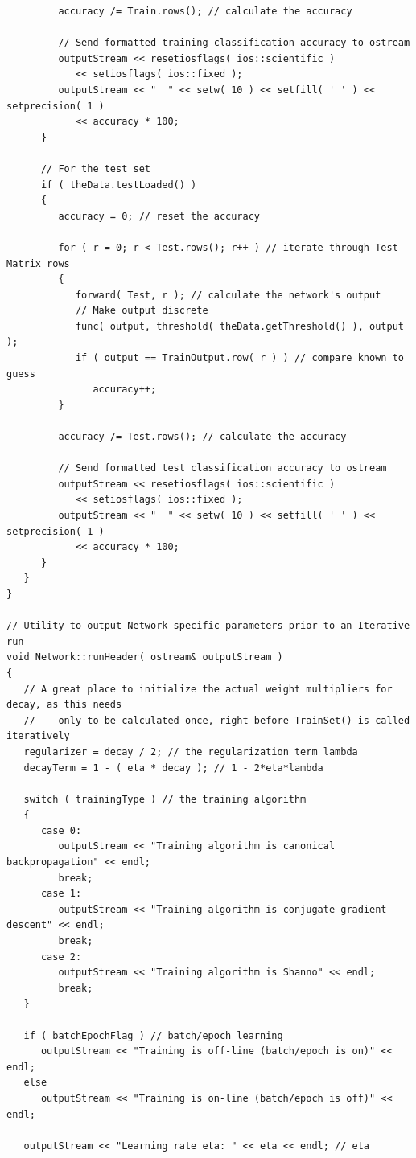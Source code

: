 \documentclass{report}[10pt]
\begin{document}
\begin{verbatim}
         accuracy /= Train.rows(); // calculate the accuracy

         // Send formatted training classification accuracy to ostream
         outputStream << resetiosflags( ios::scientific )
            << setiosflags( ios::fixed );
         outputStream << "  " << setw( 10 ) << setfill( ' ' ) << setprecision( 1 )
            << accuracy * 100;
      }

      // For the test set
      if ( theData.testLoaded() )
      {
         accuracy = 0; // reset the accuracy

         for ( r = 0; r < Test.rows(); r++ ) // iterate through Test Matrix rows
         {
            forward( Test, r ); // calculate the network's output
            // Make output discrete
            func( output, threshold( theData.getThreshold() ), output );
            if ( output == TrainOutput.row( r ) ) // compare known to guess
               accuracy++;
         }

         accuracy /= Test.rows(); // calculate the accuracy

         // Send formatted test classification accuracy to ostream
         outputStream << resetiosflags( ios::scientific )
            << setiosflags( ios::fixed );
         outputStream << "  " << setw( 10 ) << setfill( ' ' ) << setprecision( 1 )
            << accuracy * 100;
      }
   }
}

// Utility to output Network specific parameters prior to an Iterative run
void Network::runHeader( ostream& outputStream )
{
   // A great place to initialize the actual weight multipliers for decay, as this needs
   //    only to be calculated once, right before TrainSet() is called iteratively
   regularizer = decay / 2; // the regularization term lambda
   decayTerm = 1 - ( eta * decay ); // 1 - 2*eta*lambda

   switch ( trainingType ) // the training algorithm
   {
      case 0:
         outputStream << "Training algorithm is canonical backpropagation" << endl;
         break;
      case 1:
         outputStream << "Training algorithm is conjugate gradient descent" << endl;
         break;
      case 2:
         outputStream << "Training algorithm is Shanno" << endl;
         break;
   }

   if ( batchEpochFlag ) // batch/epoch learning
      outputStream << "Training is off-line (batch/epoch is on)" << endl;
   else
      outputStream << "Training is on-line (batch/epoch is off)" << endl;

   outputStream << "Learning rate eta: " << eta << endl; // eta


\end{verbatim}
\end{document}
